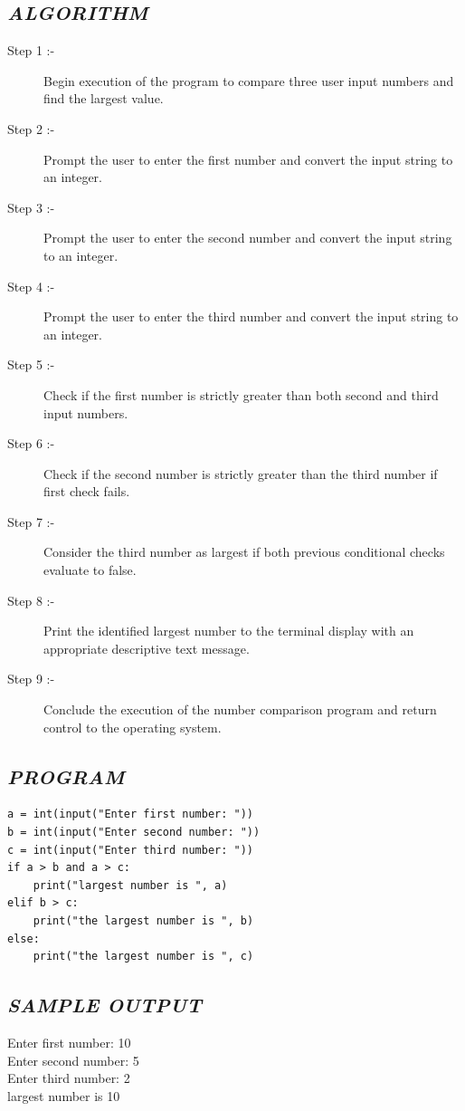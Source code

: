 \documentclass[11pt,a4paper]{article}
\begin{document}
\subsection*{\textit{ALGORITHM}}
\begin{description}
  \item[Step 1 :-] Begin execution of the program to compare three user input numbers and find the largest value.
  \item[Step 2 :-] Prompt the user to enter the first number and convert the input string to an integer.
  \item[Step 3 :-] Prompt the user to enter the second number and convert the input string to an integer.
  \item[Step 4 :-] Prompt the user to enter the third number and convert the input string to an integer.
  \item[Step 5 :-] Check if the first number is strictly greater than both second and third input numbers.
  \item[Step 6 :-] Check if the second number is strictly greater than the third number if first check fails.
  \item[Step 7 :-] Consider the third number as largest if both previous conditional checks evaluate to false.
  \item[Step 8 :-] Print the identified largest number to the terminal display with an appropriate descriptive text message.
  \item[Step 9 :-] Conclude the execution of the number comparison program and return control to the operating system.
\end{description}

\subsection*{\textit{PROGRAM}}
\begin{lstlisting}[style=pythonstyle]
a = int(input("Enter first number: ")) 
b = int(input("Enter second number: ")) 
c = int(input("Enter third number: ")) 
if a > b and a > c: 
    print("largest number is ", a) 
elif b > c: 
    print("the largest number is ", b) 
else: 
    print("the largest number is ", c)
\end{lstlisting}

\subsection*{\textit{SAMPLE OUTPUT}}
\begin{tcolorbox}[colback=black!85,colframe=navyblue,title=\textbf{Terminal Output},coltitle=white,fonttitle=\bfseries\small]
\small\ttfamily\color{green!30!white}
Enter first number: 10\\
Enter second number: 5\\
Enter third number: 2\\
largest number is 10
\end{tcolorbox}
\end{document}
